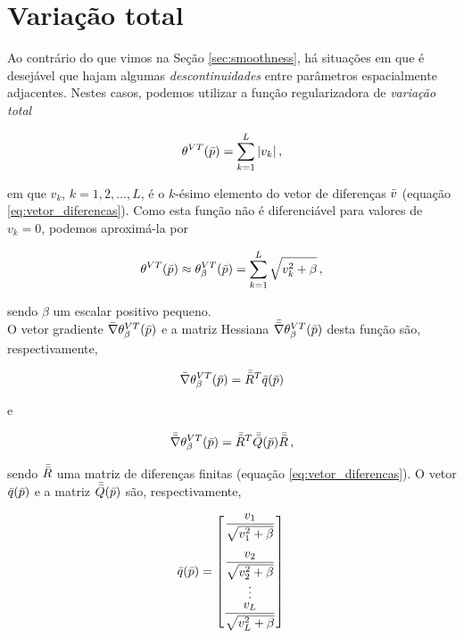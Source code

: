 \section{Variação total}

Ao contrário do que vimos na Seção \ref{sec:smoothness}, há situações em que é
desejável que hajam algumas {\it descontinuidades} entre parâmetros espacialmente
adjacentes. Nestes casos, podemos utilizar a função regularizadora de
{\it variação total}

\begin{equation}
\theta^{VT}(\bar{p}) = \sum\limits_{k=1}^L |v_k| \thinspace ,
\end{equation}

\noindent em que $v_k$, $k=1,2,\dotsc,L$, é o $k$-ésimo elemento do vetor de
diferenças $\bar{v}$ (equação \ref{eq:vetor_diferencas}).
Como esta função não é diferenciável para valores de $v_k = 0$, podemos
aproximá-la por

\begin{equation}
\theta^{VT}(\bar{p}) \approx \theta^{VT}_\beta(\bar{p}) =
    \sum\limits_{k=1}^L \sqrt{v_k^2 + \beta} \thinspace ,
\end{equation}

\noindent sendo $\beta$ um escalar positivo pequeno.
\\
\indent O vetor gradiente $\bar{\nabla}\theta^{VT}_\beta(\bar{p})$ e a matriz
Hessiana $\bar{\bar{\nabla}}\theta^{VT}_\beta(\bar{p})$ desta função
são, respectivamente, \citep{martins_etal2011}

\begin{equation}
\bar{\nabla}\theta^{VT}_\beta(\bar{p}) = \bar{\bar{R}}^T \bar{q}(\bar{p})
\label{eq:grad_tv}
\end{equation}

\noindent e

\begin{equation}
\bar{\bar{\nabla}}\theta^{VT}_\beta(\bar{p}) = \bar{\bar{R}}^T \bar{\bar{Q}}(\bar{p})\bar{\bar{R}}
\thinspace ,
\label{eq:hessian_tv}
\end{equation}

\noindent
sendo $\bar{\bar{R}}$ uma matriz de diferenças finitas
(equação \ref{eq:vetor_diferencas}).
O vetor $\bar{q}(\bar{p})$ e a matriz $\bar{\bar{Q}}(\bar{p})$ são, respectivamente,

\begin{equation}
\vect{q}(\vect{p}) =
    \begin{bmatrix}
    \dfrac{v_1}{\sqrt{v_1^2 + \beta}} \vspace{0.3cm}\\
    \dfrac{v_2}{\sqrt{v_2^2 + \beta}} \\
    \vdots \\ \dfrac{v_L}{\sqrt{v_L^2 + \beta}}
    \end{bmatrix} \thinspace
\end{equation}

